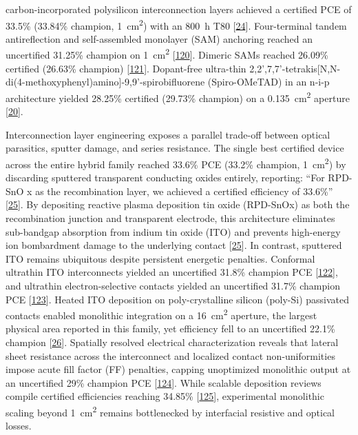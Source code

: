 \documentclass[
  11pt,
]{article}
\begin{document}
carbon-incorporated polysilicon interconnection layers achieved a
certified PCE of 33.5\% (33.84\% champion,
\qty{1}{\centi\meter\squared}) with an \qty{800}{\hour} T80
{[}\href{https://doi.org/10.1038/s41467-026-72794-x}{24}{]}.
Four-terminal tandem antireflection and self-assembled monolayer (SAM)
anchoring reached an uncertified 31.25\% champion on
\qty{1}{\centi\meter\squared}
{[}\href{https://doi.org/10.1002/aenm.71036}{120}{]}. Dimeric SAMs
reached 26.09\% certified (26.63\% champion)
{[}\href{https://doi.org/10.1002/anie.5905435}{121}{]}. Dopant-free
ultra-thin
2,2',7,7'-tetrakis{[}N,N-di(4-methoxyphenyl)amino{]}-9,9'-spirobifluorene
(Spiro-OMeTAD) in an n-i-p architecture yielded 28.25\% certified
(29.73\% champion) on a \qty{0.135}{\centi\meter\squared} aperture
{[}\href{https://doi.org/10.1007/s40820-025-01962-3}{20}{]}.

Interconnection layer engineering exposes a parallel trade-off between
optical parasitics, sputter damage, and series resistance. The single
best certified device across the entire hybrid family reached 33.6\% PCE
(33.2\% champion, \qty{1}{\centi\meter\squared}) by discarding sputtered
transparent conducting oxides entirely, reporting: ``For RPD-SnO x as
the recombination layer, we achieved a certified efficiency of 33.6\%''
{[}\href{https://doi.org/10.1126/science.aef5355}{25}{]}. By depositing
reactive plasma deposition tin oxide (RPD-SnOx) as both the
recombination junction and transparent electrode, this architecture
eliminates sub-bandgap absorption from indium tin oxide (ITO) and
prevents high-energy ion bombardment damage to the underlying contact
{[}\href{https://doi.org/10.1126/science.aef5355}{25}{]}. In contrast,
sputtered ITO remains ubiquitous despite persistent energetic penalties.
Conformal ultrathin ITO interconnects yielded an uncertified 31.8\%
champion PCE {[}\href{https://doi.org/10.1002/adfm.75311}{122}{]}, and
ultrathin electron-selective contacts yielded an uncertified 31.7\%
champion PCE
{[}\href{https://doi.org/10.1021/acsenergylett.5c04082}{123}{]}. Heated
ITO deposition on poly-crystalline silicon (poly-Si) passivated contacts
enabled monolithic integration on a \qty{16}{\centi\meter\squared}
aperture, the largest physical area reported in this family, yet
efficiency fell to an uncertified 22.1\% champion
{[}\href{https://doi.org/10.1016/j.solmat.2026.114223}{26}{]}. Spatially
resolved electrical characterization reveals that lateral sheet
resistance across the interconnect and localized contact
non-uniformities impose acute fill factor (FF) penalties, capping
unoptimized monolithic output at an uncertified 29\% champion PCE
{[}\href{https://doi.org/10.1002/smll.202513958}{124}{]}. While scalable
deposition reviews compile certified efficiencies reaching 34.85\%
{[}\href{https://doi.org/10.1002/adom.202503341}{125}{]}, experimental
monolithic scaling beyond \qty{1}{\centi\meter\squared} remains
bottlenecked by interfacial resistive and optical losses.
\end{document}
